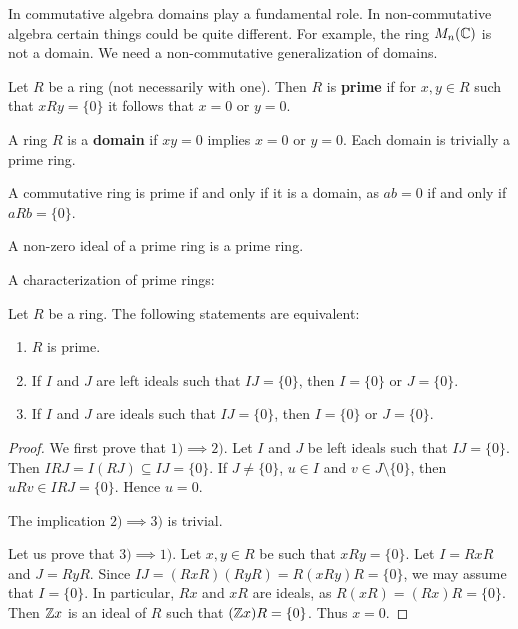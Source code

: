 
In commutative algebra domains play a fundamental role. In non-commutative
algebra certain things could be quite different. 
For example, the ring $M_n(\mathbb{C})$ is not a domain.
We need a non-commutative generalization of domains.

\begin{definition}
	Let $R$ be a ring (not necessarily with one). Then $R$ is
	\textbf{prime} if for $x,y\in R$ such that $xRy=\{0\}$ it follows that $x=0$ or 
	$y=0$.
\end{definition}

\begin{example}
	A ring $R$ is a \textbf{domain} if $xy=0$ implies
	$x=0$ or $y=0$. Each domain is trivially a prime ring.
\end{example}

\begin{example}
    A commutative ring is prime if and only if it is a domain, as $ab=0$ 
    if and only if $aRb=\{0\}$.
\end{example}

\begin{example}
    A non-zero ideal of a prime ring is a prime ring.
\end{example}

A characterization of prime rings:

\begin{proposition}
    Let $R$ be a ring. The following statements are equivalent:
	\begin{enumerate}
		\item $R$ is prime.
		\item If $I$ and $J$ are left ideals such that $IJ=\{0\}$, then 
			$I=\{0\}$ or $J=\{0\}$.
		\item If $I$ and $J$ are ideals such that $IJ=\{0\}$, then $I=\{0\}$ or
			$J=\{0\}$.
	\end{enumerate}
\end{proposition}

\begin{proof}
	We first prove that $1)\implies2)$. Let $I$ and $J$ be left ideals such that
	$IJ=\{0\}$. Then $IRJ=I(RJ)\subseteq IJ=\{0\}$. If $J\ne
	\{0\}$, $u\in I$ and $v\in J\setminus\{0\}$, then $uRv\in IRJ=\{0\}$. Hence 
	$u=0$.

	The implication $2)\implies3)$ is trivial. 

    Let us prove that $3)\implies1)$. Let $x,y\in R$ be such that $xRy=\{0\}$.
	Let $I=RxR$ and $J=RyR$. Since $IJ=(RxR)(RyR)=R(xRy)R=\{0\}$, 
	we may assume that $I=\{0\}$. In particular, $Rx$ and $xR$ are ideals, as 
	$R(xR)=(Rx)R=\{0\}$. Then $\mathbb{Z} x$ is an ideal of $R$ such that $(\mathbb{Z} x)R=\{0\}$. 
	Thus $x=0$. 
\end{proof}

